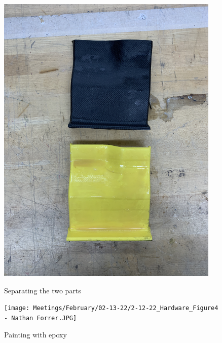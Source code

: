 \begin{figure}[ht]
\centering
\begin{minipage}[b]{.48\textwidth}
  \centering
  \includegraphics[width=0.95\textwidth]{Meetings/February/02-13-22/2-12-22_Hardware_Figure3 - Nathan Forrer.JPG}
  \caption{Separating the two parts}
  \label{fig:021322_3}
\end{minipage}%
\hfill%
\begin{minipage}[b]{.48\textwidth}
  \centering
  \texttt{[image: Meetings/February/02-13-22/2-12-22\_Hardware\_Figure4 - Nathan Forrer.JPG]}
  \caption{Painting with epoxy}
  \label{fig:021322_4}
\end{minipage}
\end{figure}



